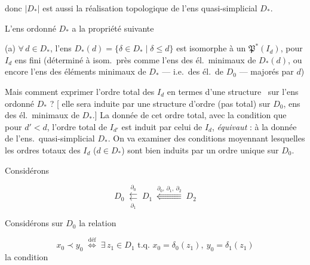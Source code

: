 \documentclass[11pt,a4paper]{article}
\begin{document}
donc $|D_*|$ est aussi la réalisation topologique de l'ens
quasi-simplicial $D_*$.

L'ens ordonné $D_*$ a la propriété suivante

(a) $\forall\, d \in D_*$, l'ens  $D_*(d) = \lbrace \delta
\in D_* \mid \delta \leqslant d \rbrace$ est isomorphe à un
$\mathfrak{P}^*(I_d)$, pour $I_d$ ens fini (déterminé à isom.\ près comme
l'ens des él.\ minimaux de $D_*(d)$, ou encore l'ens des éléments minimaux
de $D_*$ --- i.e.\ des él.\ de $D_0$ --- majorés par $d$)

Mais comment exprimer l'ordre total des $I_d$  en
termes d'une structure \ sur l'ens ordonné $D_*$ ?
[ elle sera induite par une structure d'ordre (pas
total) sur $D_0$, ens des él.\ minimaux de $D_*$.] La donnée de cet
ordre total, avec la condition que pour $d' < d$, l'ordre total de
$I_{d'}$ est induit par celui de $I_d$, \emph{équivaut} : à la donnée de
l'ens.\ quasi-simplicial $D_*$. On va examiner des conditions  moyennant lesquelles les ordres totaux des $I_d$ ($d \in D_*$)
sont bien induits par un ordre unique sur $D_0$.

Considérons

\[
  D_0 \;\overset{\partial_0}{\underset{\partial_1}{\leftleftarrows}}\; D_1
  \;\overset{\partial_0,\ \partial_1,\ \partial_2}{\Lleftarrow}\; D_2
\]

Considérons sur $D_0$ la relation

\[
  x_0 \prec y_0 \;\overset{\text{déf}}{\Longleftrightarrow}\; \exists\, z_1
  \in D_1 \text{ t.q. } x_0 = \delta_0(z_1),\ y_0 = \delta_1(z_1)
\]
la condition 
\struck{\ill{}}
\end{document}

